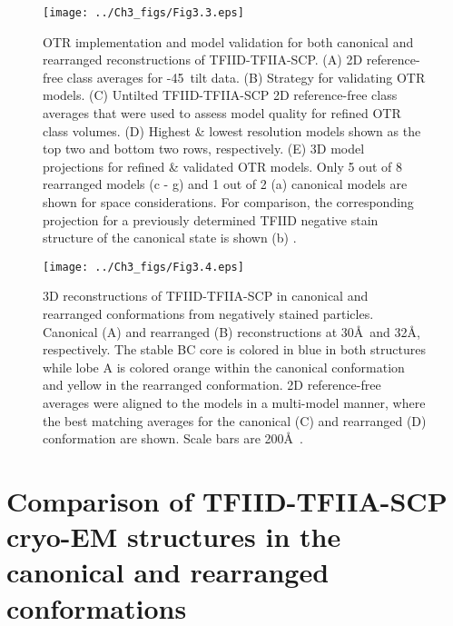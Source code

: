 \begin{figure}
\centering
\texttt{[image: ../Ch3\_figs/Fig3.3.eps]}
\caption[OTR implementation and model validation for both canonical and rearranged reconstructions of TFIID-TFIIA-SCP]{OTR implementation and model validation for both canonical and rearranged reconstructions of TFIID-TFIIA-SCP. (A) 2D reference-free class averages for -45\textdegree\ tilt data.  (B) Strategy for validating OTR models.  (C) Untilted TFIID-TFIIA-SCP 2D reference-free class averages that were used to assess model quality for refined OTR class volumes. (D) Highest \& lowest resolution models shown as the top two and bottom two rows, respectively.  (E) 3D model projections for refined \& validated OTR models.  Only 5 out of 8 rearranged models (c - g) and 1 out of 2 (a) canonical models are shown for space considerations.  For comparison, the corresponding projection for a previously determined TFIID negative stain structure of the canonical state is shown (b) \cite{Grob_1281}.}
\label{fig:Fig3.3}
\end{figure}
\begin{figure}
\centering
\texttt{[image: ../Ch3\_figs/Fig3.4.eps]}
\caption[3D reconstructions of TFIID-TFIIA-SCP in canonical and rearranged conformations from negatively stained particles]{3D reconstructions of TFIID-TFIIA-SCP in canonical and rearranged conformations from negatively stained particles.  Canonical (A) and rearranged (B) reconstructions at 30\AA\ and 32\AA , respectively. The stable BC core is colored in blue in both structures while lobe A is colored orange within the canonical conformation and yellow in the rearranged conformation. 2D reference-free averages were aligned to the models in a multi-model manner, where the best matching averages for the canonical (C) and rearranged (D) conformation are shown.  Scale bars are 200\AA\ .}
\label{fig:Fig3.4}
\end{figure}

\section{Comparison of TFIID-TFIIA-SCP cryo-EM structures in the canonical and rearranged conformations}


